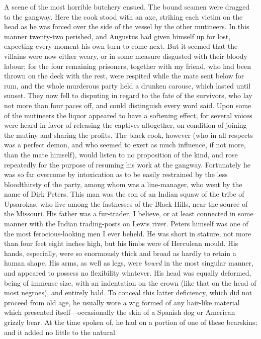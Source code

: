 A scene of the most horrible butchery ensued. The bound seamen were dragged
to the gangway. Here the cook stood with an axe, striking each victim on the
head as he was forced over the side of the vessel by the other mutineers. In
this manner twenty-two perished, and Augustus had given himself up for lost,
expecting every moment his own turn to come next. But it seemed that the
villains were now either weary, or in some measure disgusted with their bloody
labour; for the four remaining prisoners, together with my friend, who had been
thrown on the deck with the rest, were respited while the mate sent below for
rum, and the whole murderous party held a drunken carouse, which lasted until
sunset. They now fell to disputing in regard to the fate of the survivors, who
lay not more than four paces off, and could distinguish every word said. Upon
some of the mutineers the liquor appeared to have a softening effect, for
several voices were heard in favor of releasing the captives altogether, on
condition of joining the mutiny and sharing the profits. The black cook, however
(who in all respects was a perfect demon, and who seemed to exert as much
influence, if not more, than the mate himself), would listen to no proposition
of the kind, and rose repeatedly for the purpose of resuming his work at the
gangway. Fortunately he was so far overcome by intoxication as to be easily
restrained by the less bloodthirsty of the party, among whom was a line-manager,
who went by the name of Dirk Peters. This man was the son of an Indian squaw of
the tribe of Upsarokas, who live among the fastnesses of the Black Hills, near
the source of the Missouri. His father was a fur-trader, I believe, or at least
connected in some manner with the Indian trading-posts on Lewis river. Peters
himself was one of the most ferocious-looking men I ever beheld. He was short in
stature, not more than four feet eight inches high, but his limbs were of
Herculean mould. His hands, especially, were so enormously thick and broad as
hardly to retain a human shape. His arms, as well as legs, were \emph{bowed} in
the most singular manner, and appeared to possess no flexibility whatever. His
head was equally deformed, being of immense size, with an indentation on the
crown (like that on the head of most negroes), and entirely bald. To conceal
this latter deficiency, which did not proceed from old age, he usually wore a
wig formed of any hair-like material which presented itself---occasionally the
skin of a Spanish dog or American grizzly bear. At the time spoken of, he had on
a portion of one of these bearskins; and it added no little to the natural

